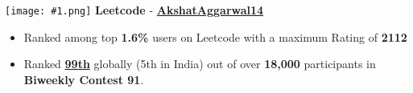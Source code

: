 \documentclass[a4paper]{article}
\newcommand{\tinyBulletSep} { \vspace{2mm} }
\newcommand{\bulletSep} { \vspace{2.5mm} }
\newcommand{\sectionSep} { \vspace{3mm} }
\newcommand{\lineunder} {
    \vspace*{-8pt} \\
    \hspace*{-15pt} \hrulefill \\
}
\newcommand{\header} [1] {
    {\hspace*{-18pt}\vspace*{6pt} {
        \fontfamily{qcs}\selectfont \large \scshape #1
    }}
    \vspace*{-6pt} \lineunder
    \vspace{1.1mm}
}
\newcommand{\volunteerItem}[5]{
    \textbf{#1} -- \textit{#2} \hfill #3 \\
    \begin{itemize}
        #4
    \end{itemize}
}
\newcommand{\link}[2]{
    \href{#1}{\textbf{#2}}
}
\newcommand{\image}[1]{
    \begingroup
    \normalfont
    \Large
    \texttt{[image: \#1.png]}%
    \endgroup
}
\begin{document}
\image{lc} \textbf{Leetcode} -\textbf{\link{https://leetcode.com/AkshatAggarwal14/}{AkshatAggarwal14}}
\begin{itemize}
    \item Ranked among top \textbf{1.6\%} users on Leetcode with a maximum Rating of \textbf{2112}
    \item Ranked\textbf{\link{https://clist.by/standings/biweekly-contest-91-38396296/?country=IN}{99th}}globally (5th in India) out of over \textbf{18,000} participants in \textbf{Biweekly Contest 91}.
\end{itemize}







\end{document}
